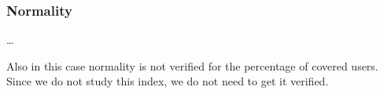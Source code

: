 \subsubsection{Normality}\label{subsubsec:rectassumptionsnormality}

\ldots

Also in this case normality is not verified for the percentage of covered users.
Since we do not study this index, we do not need to get it verified.
